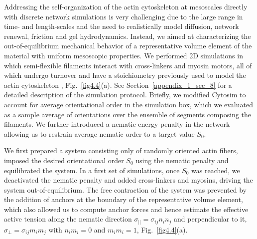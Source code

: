 Addressing the self-organization of the actin cytoskeleton at mesoscales directly with discrete network simulations is very challenging due to the large range in time- and length-scales and the need to realistically model diffusion, network renewal, friction and gel hydrodynamics. Instead, we aimed at characterizing the out-of-equilibrium mechanical behavior of a representative volume element of the material with uniform mesoscopic properties. We performed 2D simulations in which semi-flexible filaments interact with cross-linkers and myosin motors, all of which undergo turnover and have a stoichiometry previously used to model the actin cytoskeleton \cite{Cortes2020}, Fig.~\ref{fig4.4}(a). See Section~\ref{appendix_1_sec_8} for a detailed description of the simulation protocol. Briefly, we modified Cytosim to account for average orientational order in the simulation box, which we evaluated as a sample average of orientations over the ensemble of segments composing the filaments. We further introduced a nematic energy penalty in the network allowing us to restrain average nematic order to a target value $S_0$.

We first prepared a system consisting only of randomly oriented actin fibers, imposed the desired orientational order $S_0$ using the nematic penalty  and equilibrated the system. In a first set of simulations, once $S_0$ was reached, we deactivated the nematic penalty and added cross-linkers and myosins, driving the system out-of-equilibrium. The free contraction of the system was prevented by the addition of anchors at the boundary of the representative volume element, which also allowed us to compute anchor forces and hence estimate the effective active tension along the nematic direction $\sigma_{||} = \sigma_{ij} n_i n_j$ and perpendicular to it, $\sigma_{\bot}=\sigma_{ij} m_i m_j$ with $n_im_i = 0$ and $m_im_i = 1$, Fig.~\ref{fig4.4}(a). 

